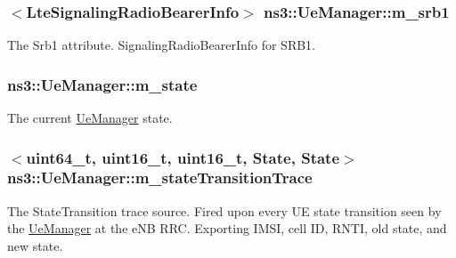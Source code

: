 \subsubsection[{\texorpdfstring{m\+\_\+srb1}{m_srb1}}]{$<${\bf Lte\+Signaling\+Radio\+Bearer\+Info}$>$ ns3\+::\+Ue\+Manager\+::m\+\_\+srb1\hspace{0.3cm}{\ttfamily [private]}}\hypertarget{classns3_1_1UeManager_a196852199b6a48c365eadfec4ba89935}{}\label{classns3_1_1UeManager_a196852199b6a48c365eadfec4ba89935}
The {\ttfamily Srb1} attribute. Signaling\+Radio\+Bearer\+Info for S\+R\+B1. 
\subsubsection[{\texorpdfstring{m\+\_\+state}{m_state}}]{ ns3\+::\+Ue\+Manager\+::m\+\_\+state\hspace{0.3cm}{\ttfamily [private]}}\hypertarget{classns3_1_1UeManager_aaed4b2490297cb912e743084f1a27b08}{}\label{classns3_1_1UeManager_aaed4b2490297cb912e743084f1a27b08}


The current \hyperlink{classns3_1_1UeManager}{Ue\+Manager} state. 

\subsubsection[{\texorpdfstring{m\+\_\+state\+Transition\+Trace}{m_stateTransitionTrace}}]{$<$uint64\+\_\+t, uint16\+\_\+t, uint16\+\_\+t, {\bf State}, {\bf State}$>$ ns3\+::\+Ue\+Manager\+::m\+\_\+state\+Transition\+Trace\hspace{0.3cm}{\ttfamily [private]}}\hypertarget{classns3_1_1UeManager_ac17d478044a6111ca71b05d8b3950bf7}{}\label{classns3_1_1UeManager_ac17d478044a6111ca71b05d8b3950bf7}
The {\ttfamily State\+Transition} trace source. Fired upon every UE state transition seen by the \hyperlink{classns3_1_1UeManager}{Ue\+Manager} at the e\+NB R\+RC. Exporting I\+M\+SI, cell ID, R\+N\+TI, old state, and new state. 
